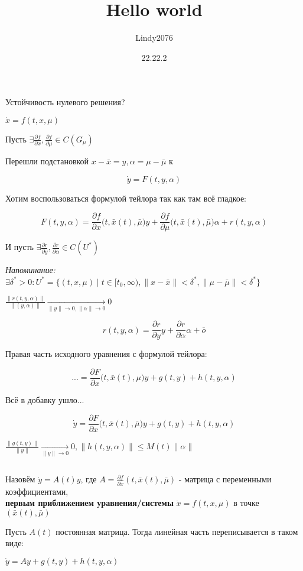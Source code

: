 \documentclass[12pt, a4paper]{article}
\title{Hello world}
\author{Lindy2076}
\date{22.22.2} %
\begin{document}
  Устойчивость нулевого решения?

  $\dot x = f(t,x,\mu)$

  Пусть $\exists \frac{\partial f}{\partial x}, \frac{\partial f}{\partial \mu} \in C(G_\mu)$

  Перешли подстановкой $x-\bar x = y, \alpha = \mu - \bar \mu$ к

  $$\dot y = F(t, y, \alpha) $$

  Хотим воспользоваться формулой тейлора так как там всё гладкое:

  $$F(t,y,\alpha) = \frac{\partial f }{\partial x}\big(t, \bar x(t), \bar \mu\big)y  + \frac{\partial f}{\partial \mu}\big(t, \bar x(t), \bar \mu\big)\alpha + r(t, y, \alpha)$$

  И пусть $\exists \frac{\partial r}{\partial y}, \frac{\partial r}{\partial \alpha} \in C(U^*)$ 
  
  \textit{Напоминание:} $\exists \delta^* > 0 : U^* = \{(t, x, \mu) \mid t \in [t_0, \infty), \| x - \bar x \| < \delta^*, \| \mu - \bar \mu \| < \delta^*\}$

  $\frac{\| r(t, y, \alpha) \|}{\| (y, \alpha)\| } \underset{\|y\| \to 0, \|\alpha\| \to 0}{\longrightarrow} 0$

  $$r(t,y,\alpha) = \frac{\partial r}{\partial y}y + \frac{\partial r}{\partial \alpha}\alpha + \bar o$$

  Правая часть исходного уравнения с формулой тейлора:

  $$ ... = \frac{\partial F}{\partial x}\big(t, \bar x(t), \mu\big)y + g(t,y) + h(t,y,\alpha)$$

  Всё в добавку ушло...

  $$\dot y = \frac{\partial F}{\partial x}\big(t, \bar x(t), \bar \mu\big)y + g(t, y) + h(t, y, \alpha)$$

  $ \frac{\| g(t,y) \|}{\|y\|} \underset{\|y\| \to 0}{\longrightarrow} 0, \| h(t,y,\alpha)\| \le M(t)\|\alpha\| $

  \par $ $
  
  Назовём $\dot y = A(t)y$, где $A = \frac{\partial f}{\partial x}(t, \bar x(t), \bar \mu)$ - матрица с переменными коэффициентами, \\\textbf{первым приближением уравнения/системы} $\dot x = f (t, x, \mu)$ в точке $(\bar x(t), \bar \mu)$

  Пусть $A(t)$ постоянная матрица. Тогда линейная часть переписывается в таком виде:

  $\dot y = Ay + g(t, y) + h(t, y, \alpha)$
\end{document}

